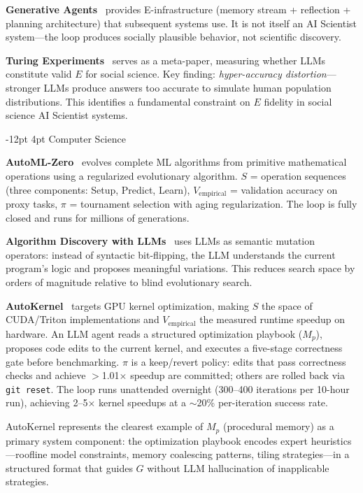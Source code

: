 \documentclass[11pt]{article}
\makeatletter
\renewcommand\subsection{\@startsection{subsection}{2}{\z@}%
  {-12pt \@plus -2pt \@minus -2pt}%
  {4pt \@plus 1pt}%
  {\normalfont\normalsize\bfseries}}
\makeatother
\begin{document}
\textbf{Generative Agents}~\citep{park2023generative} provides E-infrastructure (memory stream + reflection + planning architecture) that subsequent systems use. It is not itself an AI Scientist system---the loop produces socially plausible behavior, not scientific discovery.

\textbf{Turing Experiments}~\citep{aher2023turing} serves as a meta-paper, measuring whether LLMs constitute valid $E$ for social science. Key finding: \emph{hyper-accuracy distortion}---stronger LLMs produce answers too accurate to simulate human population distributions. This identifies a fundamental constraint on $E$ fidelity in social science AI Scientist systems.

\subsection{Computer Science}

\textbf{AutoML-Zero}~\citep{real2020automlzero} evolves complete ML algorithms from primitive mathematical operations using a regularized evolutionary algorithm. $S$ = operation sequences (three components: Setup, Predict, Learn), $V_\text{empirical}$ = validation accuracy on proxy tasks, $\pi$ = tournament selection with aging regularization. The loop is fully closed and runs for millions of generations.

\textbf{Algorithm Discovery with LLMs}~\citep{sartori2024algodiscovery} uses LLMs as semantic mutation operators: instead of syntactic bit-flipping, the LLM understands the current program's logic and proposes meaningful variations. This reduces search space by orders of magnitude relative to blind evolutionary search.

\textbf{AutoKernel}~\citep{jaber2026autokernel} targets GPU kernel optimization, making $S$ the space of CUDA/Triton implementations and $V_\text{empirical}$ the measured runtime speedup on hardware. An LLM agent reads a structured optimization playbook ($M_p$), proposes code edits to the current kernel, and executes a five-stage correctness gate before benchmarking. $\pi$ is a keep/revert policy: edits that pass correctness checks and achieve $>$1.01$\times$ speedup are committed; others are rolled back via \texttt{git reset}. The loop runs unattended overnight (300--400 iterations per 10-hour run), achieving 2--5$\times$ kernel speedups at a $\sim$20\% per-iteration success rate.

AutoKernel represents the clearest example of $M_p$ (procedural memory) as a primary system component: the optimization playbook encodes expert heuristics---roofline model constraints, memory coalescing patterns, tiling strategies---in a structured format that guides $G$ without LLM hallucination of inapplicable strategies.
\end{document}
